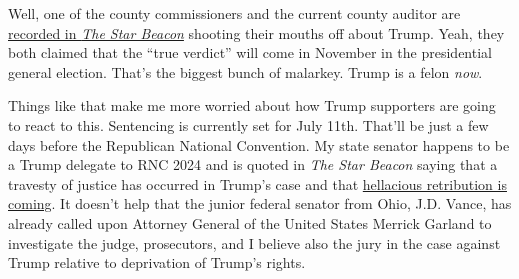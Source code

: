 Well, one of the county commissioners and the current county auditor are
\href{https://www.starbeacon.com/news/local_news/local-officials-react-to-trump-verdict/article_a354f58c-1ed0-11ef-99d7-bf64dc900a28.html}{recorded
in \emph{The Star Beacon}} shooting their mouths off about Trump. Yeah,
they both claimed that the ``true verdict'' will come in November in the
presidential general election. That's the biggest bunch of malarkey.
Trump is a felon \emph{now}.

Things like that make me more worried about how Trump supporters are
going to react to this. Sentencing is currently set for July 11th.
That'll be just a few days before the Republican National Convention. My
state senator happens to be a Trump delegate to RNC 2024 and is quoted
in \emph{The Star Beacon} saying that a travesty of justice has occurred
in Trump's case and that \href{https://archive.ph/GlNMF}{hellacious
retribution is coming}. It doesn't help that the junior federal senator
from Ohio, J.D. Vance, has already called upon Attorney General of the
United States Merrick Garland to investigate the judge, prosecutors, and
I believe also the jury in the case against Trump relative to
deprivation of Trump's rights.
